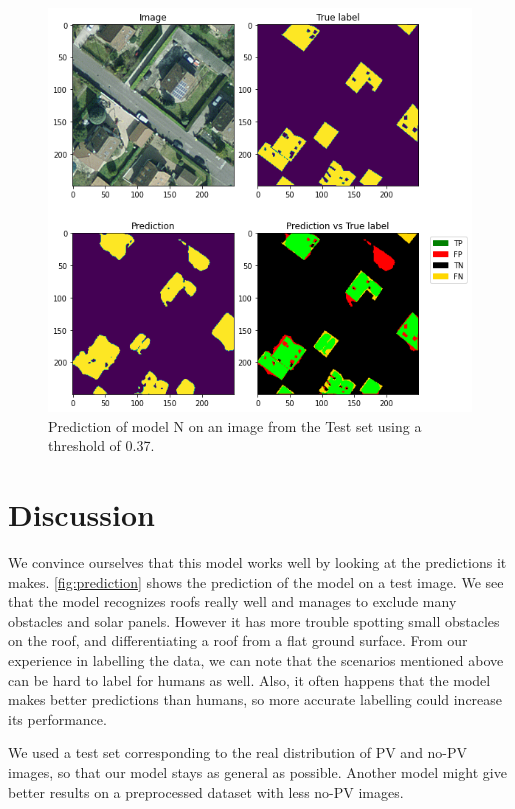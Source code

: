 \documentclass[10pt,conference]{IEEEtran}
\begin{document}
\begin{figure}[tbp]
    \centering
    \includegraphics[width=.9\columnwidth]{report/images/prediction.png}
    \caption{Prediction of model N on an image from the Test set using a threshold of 0.37.}
    \label{fig:prediction}
    \vspace{-0.5cm}
\end{figure}

\section{Discussion}
We convince ourselves that this model works well by looking at the predictions it makes. \autoref{fig:prediction} shows the prediction of the model on a test image.
We see that the model recognizes roofs really well and manages to exclude many obstacles and solar panels. However it has more trouble spotting small obstacles on the roof, and differentiating a roof from a flat ground surface.
From our experience in labelling the data, we can note that the scenarios mentioned above can be hard to label for humans as well. Also, it often happens that the model makes better predictions than humans, so more accurate labelling could increase its performance.

We used a test set corresponding to the real distribution of PV and no-PV images, so that our model stays as general as possible. Another model might give better results on a preprocessed dataset with less no-PV images.
\end{document}

